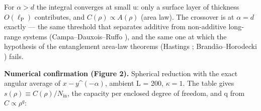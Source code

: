 \documentclass[12pt]{iopart}
\begin{document}
For \(\alpha  > d\) the integral converges at small u: only a surface
layer of thickness \(O(\ell _{\mathrm{P}})\) contributes, and
\(C(\rho ) \propto  A(\rho )\) (area law). The crossover is at
\(\alpha  = d\) exactly --- the same threshold that separates additive
from non-additive long-range systems (Campa--Dauxois--Ruffo
\citep{Campa:2009jxa}), and the same one at which the hypothesis of the
entanglement area-law theorems (Hastings \citep{Hastings:2007iok};
Brandão--Horodecki \citep{Brandao:2013fpa}) fails.

\textbf{Numerical confirmation (Figure 2).} Spherical reduction with the
exact angular average of \textbar{}\(x-y\)\textbar\^{}\((-\alpha )\),
ambient L = 200, \(\kappa  = 1\). The table gives
\(s(\rho ) \equiv  C(\rho )/N_{\mathrm{in}}\), the capacity per enclosed
degree of freedom, and q from \(C \propto  \rho ^{q}\):
\end{document}
